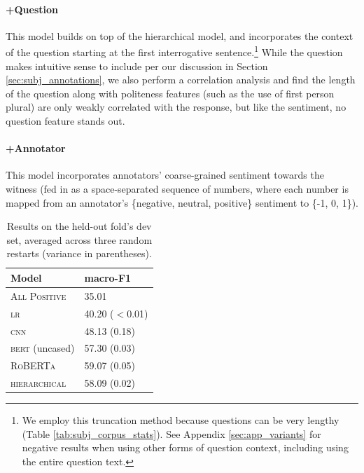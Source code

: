 \paragraph{+Question} This model builds on top of the hierarchical model, and incorporates the context of the question starting at the first interrogative sentence.\footnote{We employ this truncation method because questions can be very lengthy (Table \ref{tab:subj_corpus_stats}). See Appendix \ref{sec:app_variants} for negative results when using other forms of question context, including using the entire question text.} While the question makes intuitive sense to include per our discussion in Section \ref{sec:subj_annotations}, we also perform a correlation analysis and find the length of the question along with politeness features (such as the use of first person plural) are only weakly correlated with the response, but like the sentiment, no question feature stands out.

\paragraph{+Annotator} This model incorporates annotators' coarse-grained sentiment towards the witness (fed in as a space-separated sequence of numbers, where each number is mapped from an annotator's \{negative, neutral, positive\} sentiment to \{-1, 0, 1\}). 


\begin{table}
\centering
\small
\begin{tabular}{ll}
\toprule
Model  &macro-F1\\ 
\midrule
\textsc{All Positive} &35.01 \\
\textsc{lr} &40.20 ($<$0.01) \\
\textsc{cnn} &48.13 (0.18)\\
\midrule
\textsc{bert} (uncased) &57.30 (0.03)\\
\textsc{RoBERTa} &59.07 (0.05)\\
\textsc{hierarchical} &58.09 (0.02)\\
\bottomrule
\end{tabular}
\vspace{-.3em}
\caption{Results on the held-out fold's dev set, averaged across three random restarts (variance in parentheses).}
\label{tab:subj_base_results}
\end{table}

